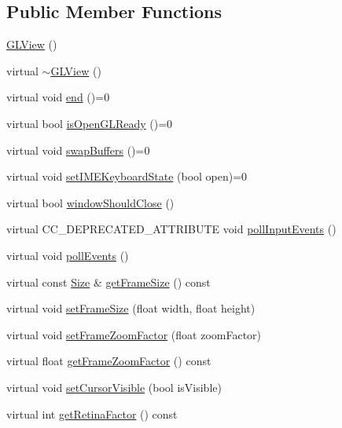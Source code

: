 \subsection*{Public Member Functions}
\begin{DoxyCompactItemize}
\item 
\hyperlink{classGLView_a33f41548b6b0256c886ce75edf8015ce}{G\+L\+View} ()
\item 
virtual \hyperlink{classGLView_a6741063a17561ed25347f1b94d354113}{$\sim$\+G\+L\+View} ()
\item 
virtual void \hyperlink{classGLView_aaa284e08de7b4e530a2b15b1d27dced0}{end} ()=0
\item 
virtual bool \hyperlink{classGLView_a23326d6cbff86205a0d5fa953557838d}{is\+Open\+G\+L\+Ready} ()=0
\item 
virtual void \hyperlink{classGLView_a8868ba73f19216f5f6c8dbcc1a7c9bb4}{swap\+Buffers} ()=0
\item 
virtual void \hyperlink{classGLView_aaa70edad9dd4b2052237867db978e06d}{set\+I\+M\+E\+Keyboard\+State} (bool open)=0
\item 
virtual bool \hyperlink{classGLView_aa7a837484fd21d7c0a394e996963e84f}{window\+Should\+Close} ()
\item 
virtual C\+C\+\_\+\+D\+E\+P\+R\+E\+C\+A\+T\+E\+D\+\_\+\+A\+T\+T\+R\+I\+B\+U\+TE void \hyperlink{classGLView_a5b93395a827f1886414a5d4186544ddb}{poll\+Input\+Events} ()
\item 
virtual void \hyperlink{classGLView_a707854960055e05a3841d4b8cf88f9ce}{poll\+Events} ()
\item 
virtual const \hyperlink{classSize}{Size} \& \hyperlink{classGLView_aadfda5aa1419ab211b4a18b12c34af3c}{get\+Frame\+Size} () const
\item 
virtual void \hyperlink{classGLView_ac18f93506550c54c119f7ae87f33f220}{set\+Frame\+Size} (float width, float height)
\item 
virtual void \hyperlink{classGLView_afe38f42b6954c9bc29382f411b49f448}{set\+Frame\+Zoom\+Factor} (float zoom\+Factor)
\item 
virtual float \hyperlink{classGLView_ab804d7568f68b8d91cf420d1c0057f38}{get\+Frame\+Zoom\+Factor} () const
\item 
virtual void \hyperlink{classGLView_a1d09cf734d01c1a789ded4caef734b2a}{set\+Cursor\+Visible} (bool is\+Visible)
\item 
virtual int \hyperlink{classGLView_a5dd430351b6192d7c014458e7863ba6d}{get\+Retina\+Factor} () const
\item 

\end{DoxyCompactItemize}
